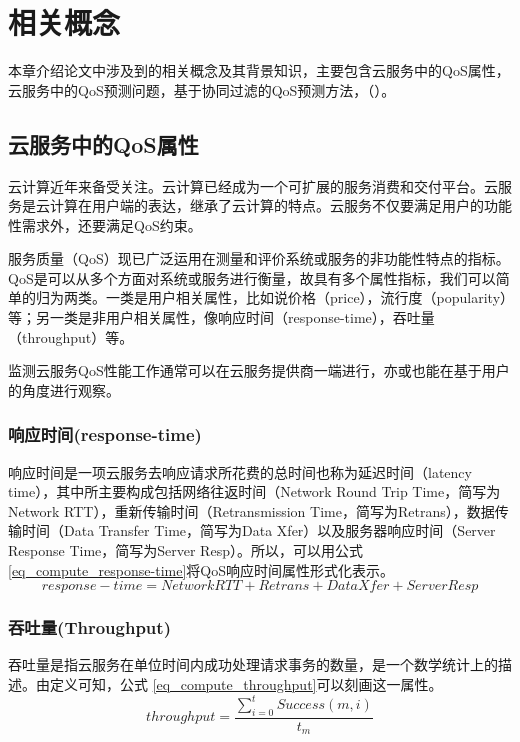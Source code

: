 \chapter{相关概念}
	\label{chapter_concepts}
	本章介绍论文中涉及到的相关概念及其背景知识，主要包含云服务中的QoS属性，云服务中的QoS预测问题，基于协同过滤的QoS预测方法，（）。
	\section{云服务中的QoS属性}
	\label{sec_QoS_attributes}
	云计算近年来备受关注。云计算已经成为一个可扩展的服务消费和交付平台。云服务是云计算在用户端的表达，继承了云计算的特点。云服务不仅要满足用户的功能性需求外，还要满足QoS约束。
	
	服务质量（QoS）现已广泛运用在测量和评价系统或服务的非功能性特点的指标。QoS是可以从多个方面对系统或服务进行衡量，故具有多个属性指标，我们可以简单的归为两类。一类是用户相关属性，比如说价格（price），流行度（popularity）等；另一类是非用户相关属性，像响应时间（response-time），吞吐量（throughput）等。
	
	监测云服务QoS性能工作通常可以在云服务提供商一端进行，亦或也能在基于用户的角度进行观察。
	
		\subsection{响应时间(response-time)}
		\label{sec_response-time}
		响应时间是一项云服务去响应请求所花费的总时间也称为延迟时间（latency time），其中所主要构成包括网络往返时间（Network Round Trip Time，简写为Network RTT），重新传输时间（Retransmission Time，简写为Retrans），数据传输时间（Data Transfer Time，简写为Data Xfer）以及服务器响应时间（Server Response Time，简写为Server Resp）。所以，可以用公式 \ref{eq_compute_response-time}将QoS响应时间属性形式化表示。
		\begin{equation}
			response-time=NetworkRTT+Retrans+DataXfer+ServerResp
			\label{eq_compute_response-time}
		\end{equation}
		\subsection{吞吐量(Throughput)}
		\label{sec_throughput}
		吞吐量是指云服务在单位时间内成功处理请求事务的数量，是一个数学统计上的描述。由定义可知，公式 \ref{eq_compute_throughput}可以刻画这一属性。
		\begin{equation}
			throughput=\frac{\sum\limits_{i=0}^{t}Success(m,i)}{t_m}
			\label{eq_compute_throughput}
		\end{equation}
